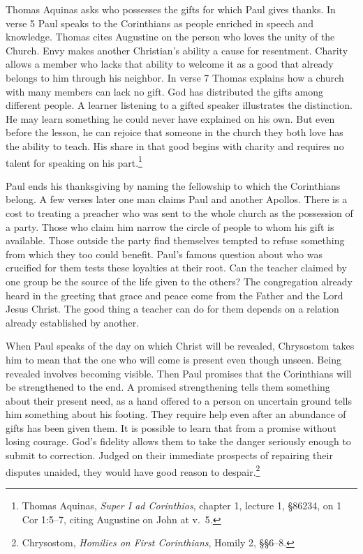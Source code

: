 Thomas Aquinas asks who possesses the gifts for which Paul gives thanks. In verse 5 Paul speaks to the Corinthians as people enriched in speech and knowledge. Thomas cites Augustine on the person who loves the unity of the Church. Envy makes another Christian's ability a cause for resentment. Charity allows a member who lacks that ability to welcome it as a good that already belongs to him through his neighbor. In verse 7 Thomas explains how a church with many members can lack no gift. God has distributed the gifts among different people. A learner listening to a gifted speaker illustrates the distinction. He may learn something he could never have explained on his own. But even before the lesson, he can rejoice that someone in the church they both love has the ability to teach. His share in that good begins with charity and requires no talent for speaking on his part.\footnote{Thomas Aquinas, \textit{Super I ad Corinthios}, chapter 1, lecture 1, §86234, on 1 Cor 1:5--7, citing Augustine on John at v.~5.}

Paul ends his thanksgiving by naming the fellowship to which the Corinthians belong. A few verses later one man claims Paul and another Apollos. There is a cost to treating a preacher who was sent to the whole church as the possession of a party. Those who claim him narrow the circle of people to whom his gift is available. Those outside the party find themselves tempted to refuse something from which they too could benefit. Paul's famous question about who was crucified for them tests these loyalties at their root. Can the teacher claimed by one group be the source of the life given to the others? The congregation already heard in the greeting that grace and peace come from the Father and the Lord Jesus Christ. The good thing a teacher can do for them depends on a relation already established by another.

When Paul speaks of the day on which Christ will be revealed, Chrysostom takes him to mean that the one who will come is present even though unseen. Being revealed involves becoming visible. Then Paul promises that the Corinthians will be strengthened to the end. A promised strengthening tells them something about their present need, as a hand offered to a person on uncertain ground tells him something about his footing. They require help even after an abundance of gifts has been given them. It is possible to learn that from a promise without losing courage. God's fidelity allows them to take the danger seriously enough to submit to correction. Judged on their immediate prospects of repairing their disputes unaided, they would have good reason to despair.\footnote{Chrysostom, \textit{Homilies on First Corinthians}, Homily 2, §§6--8.}

